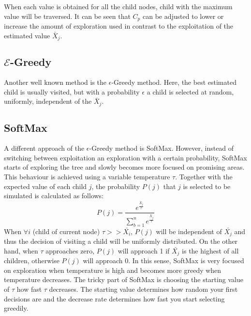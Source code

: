 When each value is obtained for all the child nodes, child with the maximum value will be traversed. It can be seen that $C_p$ can be adjusted to lower or increase the amount of exploration used in contrast to the exploitation of the estimated value $\bar{X}_j$.


\subsection{$\mathcal{E}$-Greedy}

Another well known method is the $\epsilon$-Greedy method. Here, the best estimated child is usually visited, but with a probability $\epsilon$ a child is selected at random, uniformly, independent of the $\bar{X}_j$.

\subsection{SoftMax}
A different approach of the $\epsilon$-Greedy method is SoftMax. However, instead of switching between exploitation an exploration with a certain probability, SoftMax starts of exploring the tree and slowly becomes more focused on promising areas. This behaviour is achieved using a variable temperature $\tau$. Together with the expected value of each child $j$, the probability $P(j)$ that $j$ is selected to be simulated is calculated as follows:  
\begin{equation}
P(j) = \frac{e^\frac{\bar{X}_j}{\tau}}{\sum_{b=1}^{n} e^\frac{\bar{X}_j}{\tau}}
\end{equation}
When $\forall i$ (child of current node) $\tau >> \bar{X_i}$, $P(j)$ will be independent of $\bar{X_j}$ and thus the decision of visiting a child will be uniformly distributed. On the other hand, when $\tau$ approaches zero, $P(j)$ will approach 1 if $\bar{X_j}$ is the highest of all children, otherwise $P(j)$ will approach 0. In this sense, SoftMax is very focused on exploration when temperature is high and becomes more greedy when temperature decreases. The tricky part of SoftMax is choosing the starting value of $\tau$ how fast $\tau$ decreases. The starting value determines how random your first decisions are and the decrease rate determines how fast you start selecting greedily. 
